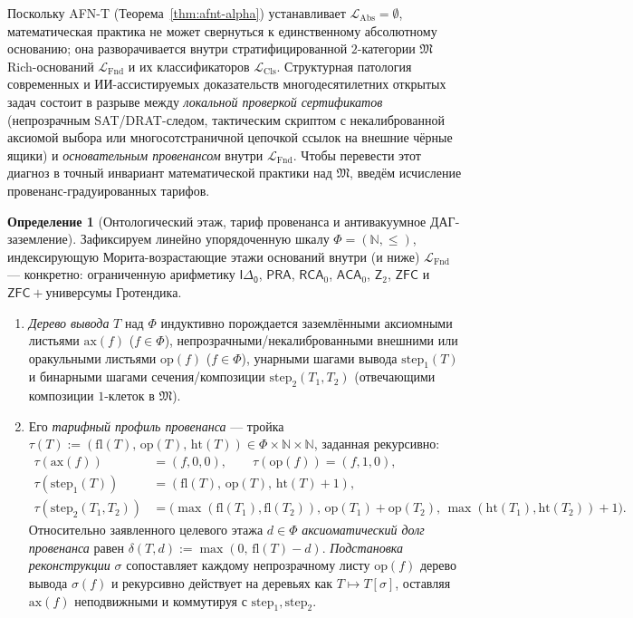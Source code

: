 \documentclass[11pt]{article}
\theoremstyle{plain}
\theoremstyle{definition}
\newtheorem{definition}[theorem]{Определение}
\newcommand{\fM}{\mathfrak{M}}
\newcommand{\LFnd}{\mathcal{L}_{\mathrm{Fnd}}}
\newcommand{\LCls}{\mathcal{L}_{\mathrm{Cls}}}
\newcommand{\LAbs}{\mathcal{L}_{\mathrm{Abs}}}
\newcommand{\ZFC}{\mathsf{ZFC}}
\begin{document}
Поскольку AFN-T (Теорема~\ref{thm:afnt-alpha}) устанавливает $\LAbs = \emptyset$, математическая практика не может свернуться к единственному абсолютному основанию; она разворачивается внутри стратифицированной $2$-категории $\fM$ Rich-оснований $\LFnd$ и их классификаторов $\LCls$. Структурная патология современных и ИИ-ассистируемых доказательств многодесятилетних открытых задач состоит в разрыве между \emph{локальной проверкой сертификатов} (непрозрачным SAT/DRAT-следом, тактическим скриптом с некалиброванной аксиомой выбора или многосотстраничной цепочкой ссылок на внешние чёрные ящики) и \emph{основательным провенансом} внутри $\LFnd$. Чтобы перевести этот диагноз в точный инвариант математической практики над $\fM$, введём исчисление провенанс-градуированных тарифов.

\begin{definition}[Онтологический этаж, тариф провенанса и антивакуумное ДАГ-заземление]\label{def:provenance-tariff}
Зафиксируем линейно упорядоченную шкалу $\Phi = (\mathbb{N}, \le)$, индексирующую Морита-возрастающие этажи оснований внутри (и ниже) $\LFnd$ --- конкретно: ограниченную арифметику $\mathsf{I\Delta_0}$, $\mathsf{PRA}$, $\mathsf{RCA}_0$, $\mathsf{ACA}_0$, $\mathsf{Z}_2$, $\ZFC$ и $\ZFC + \text{универсумы Гротендика}$.
\begin{enumerate}[nosep,label=(\roman*)]
\item \emph{Дерево вывода} $T$ над $\Phi$ индуктивно порождается заземлёнными аксиомными листьями $\mathrm{ax}(f)$ ($f \in \Phi$), непрозрачными/некалиброванными внешними или оракульными листьями $\mathrm{op}(f)$ ($f \in \Phi$), унарными шагами вывода $\mathrm{step}_1(T)$ и бинарными шагами сечения/композиции $\mathrm{step}_2(T_1, T_2)$ (отвечающими композиции $1$-клеток в $\fM$).
\item Его \emph{тарифный профиль провенанса} --- тройка $\tau(T) := (\mathrm{fl}(T),\, \mathrm{op}(T),\, \mathrm{ht}(T)) \in \Phi \times \mathbb{N} \times \mathbb{N}$, заданная рекурсивно:
\[
\begin{aligned}
\tau(\mathrm{ax}(f)) &= (f, 0, 0), \qquad \tau(\mathrm{op}(f)) = (f, 1, 0),\\
\tau(\mathrm{step}_1(T)) &= (\mathrm{fl}(T),\, \mathrm{op}(T),\, \mathrm{ht}(T)+1),\\
\tau(\mathrm{step}_2(T_1, T_2)) &= \bigl(\max(\mathrm{fl}(T_1),\mathrm{fl}(T_2)),\, \mathrm{op}(T_1)+\mathrm{op}(T_2),\, \max(\mathrm{ht}(T_1),\mathrm{ht}(T_2))+1\bigr).
\end{aligned}
\]
Относительно заявленного целевого этажа $d \in \Phi$ \emph{аксиоматический долг провенанса} равен $\delta(T, d) := \max(0,\, \mathrm{fl}(T) - d)$. \emph{Подстановка реконструкции} $\sigma$ сопоставляет каждому непрозрачному листу $\mathrm{op}(f)$ дерево вывода $\sigma(f)$ и рекурсивно действует на деревьях как $T \mapsto T[\sigma]$, оставляя $\mathrm{ax}(f)$ неподвижными и коммутируя с $\mathrm{step}_1, \mathrm{step}_2$.

\end{enumerate}
\end{definition}
\end{document}
